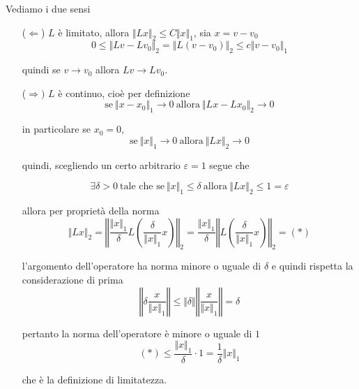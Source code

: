 \documentclass[10pt,a4paper,twoside,openright]{book}
\begin{document}
\begin{dimostrazione}
Vediamo i due sensi
\begin{itemize}
	\item[($\Leftarrow $)] $L$ è limitato, allora $\Vert Lx\Vert _{2} \leqslant C\Vert x\Vert _{1}$, sia $x=v-v_{0}$
	\begin{equation*}
		0\leqslant \Vert Lv-Lv_{0}\Vert _{2} =\Vert L( v-v_{0})\Vert _{2} \leqslant c\Vert v-v_{0}\Vert _{1}
	\end{equation*}

	quindi se $v\rightarrow v_{0}$ allora $Lv\rightarrow Lv_{0}$.

	\item[($\Rightarrow )$] $L$ è continuo, cioè per definizione
	\begin{equation*}
		\text{se} \ \Vert x-x_{0}\Vert _{1}\rightarrow 0\ \text{allora} \ \Vert Lx-Lx_{0}\Vert _{2}\rightarrow 0
	\end{equation*}

	in particolare se $x_{0} =0$,
	\begin{equation*}
		\text{se} \ \Vert x\Vert _{1}\rightarrow 0\ \text{allora} \ \Vert Lx\Vert _{2}\rightarrow 0
	\end{equation*}

	quindi, scegliendo un certo arbitrario $\varepsilon =1$ segue che

	\begin{equation*}
		\exists \delta  >0\ \text{tale che se} \ \Vert x\Vert _{1} \leqslant \delta \ \text{allora} \ \Vert Lx\Vert _{2} \leqslant 1=\varepsilon 
	\end{equation*}

	allora per proprietà della norma\begin{equation*}
		\Vert Lx\Vert _{2} =\left\Vert \frac{\Vert x\Vert _{1}}{\delta } L\left(\frac{\delta }{\Vert x\Vert _{1}} x\right)\right\Vert _{2} =\frac{\Vert x\Vert _{1}}{\delta }\left\Vert L\left(\frac{\delta }{\Vert x\Vert _{1}} x\right)\right\Vert _{2} =( *)
	\end{equation*}

	l'argomento dell'operatore ha norma minore o uguale di $\delta $ e quindi rispetta la considerazione di prima\begin{equation*}
		\left\Vert \delta \frac{x}{\Vert x\Vert _{1}}\right\Vert \leqslant \Vert \delta \Vert \left\Vert \frac{x}{\Vert x\Vert _{1}}\right\Vert =\delta 
	\end{equation*}

	pertanto la norma dell'operatore è minore o uguale di $1$\begin{equation*}
		( *) \leqslant \frac{\Vert x\Vert _{1}}{\delta } \cdotp 1=\frac{1}{\delta }\Vert x\Vert _{1}
	\end{equation*}

	che è la definizione di limitatezza.
\end{itemize}


\end{dimostrazione}
\end{document}
